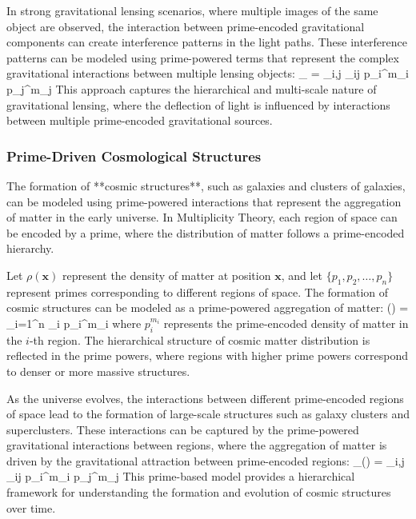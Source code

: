 \documentclass[12pt]{article}
\begin{document}
In strong gravitational lensing scenarios, where multiple images of the same object are observed, the interaction between prime-encoded gravitational components can create interference patterns in the light paths. These interference patterns can be modeled using prime-powered terms that represent the complex gravitational interactions between multiple lensing objects:
\]
\theta_{} = \sum_{i,j} \alpha_{ij} p_i^{m_i} p_j^{m_j}
\]
This approach captures the hierarchical and multi-scale nature of gravitational lensing, where the deflection of light is influenced by interactions between multiple prime-encoded gravitational sources.

\subsubsection{Prime-Driven Cosmological Structures}

The formation of **cosmic structures**, such as galaxies and clusters of galaxies, can be modeled using prime-powered interactions that represent the aggregation of matter in the early universe. In Multiplicity Theory, each region of space can be encoded by a prime, where the distribution of matter follows a prime-encoded hierarchy.

Let \( \rho(\mathbf{x}) \) represent the density of matter at position \( \mathbf{x} \), and let \( \{p_1, p_2, \dots, p_n\} \) represent primes corresponding to different regions of space. The formation of cosmic structures can be modeled as a prime-powered aggregation of matter:
\]
\rho() = \sum_{i=1}^{n} \alpha_i p_i^{m_i}
\]
where \( p_i^{m_i} \) represents the prime-encoded density of matter in the \( i \)-th region. The hierarchical structure of cosmic matter distribution is reflected in the prime powers, where regions with higher prime powers correspond to denser or more massive structures.

As the universe evolves, the interactions between different prime-encoded regions of space lead to the formation of large-scale structures such as galaxy clusters and superclusters. These interactions can be captured by the prime-powered gravitational interactions between regions, where the aggregation of matter is driven by the gravitational attraction between prime-encoded regions:
\]
\rho_{}() = \sum_{i,j} \alpha_{ij} p_i^{m_i} p_j^{m_j}
\]
This prime-based model provides a hierarchical framework for understanding the formation and evolution of cosmic structures over time.
\end{document}

